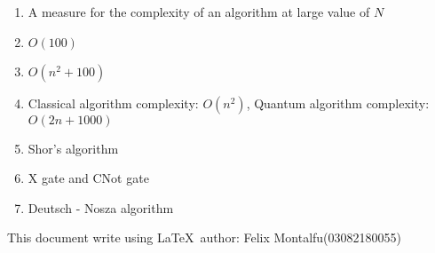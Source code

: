 \documentclass[a4paper]{article}
\begin{document}
    \begin{enumerate}[1.]
        \item A measure for the complexity of an algorithm at large value of $N$
        \item $O(100)$
        \item $O(n^{2}+100)$
        \item Classical algorithm complexity: $O(n^2)$, Quantum algorithm complexity: $O(2n+1000)$
        \item Shor's algorithm
        \item X gate and CNot gate
        \item Deutsch - Nosza algorithm
    \end{enumerate}
    This document write using \LaTeX \ author: Felix Montalfu(03082180055)
\end{document}
